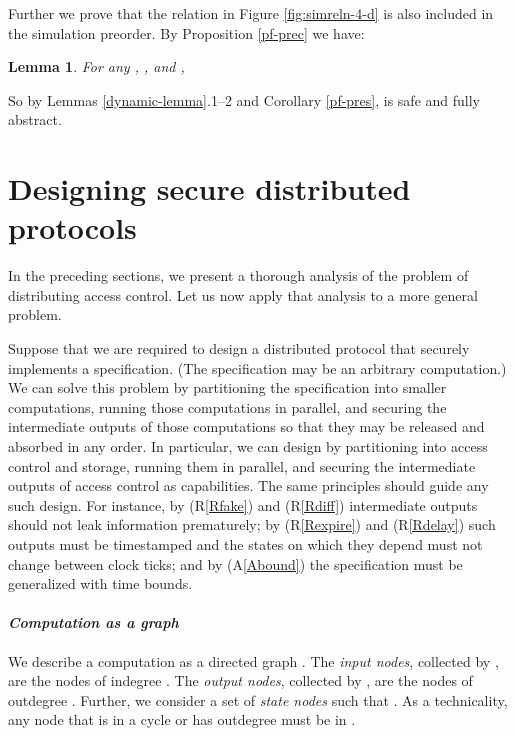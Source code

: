 \documentclass[10pt]{article}
\newtheorem{lemma}[theorem]{Lemma}
\begin{document}
Further we prove that the relation  in Figure \ref{fig:simreln-4-d} is also included in the simulation preorder. By Proposition \ref{pf-prec} we have: 
\begin{lemma}\label{dynamic-safetylemma} For any , , and , 
\vspace{0.2cm}
\par 
\par 
\end{lemma}
So by Lemmas \ref{dynamic-lemma}.1--2 and Corollary \ref{pf-pres},  is safe and fully abstract. 







\section{Designing secure distributed protocols}\label{apply}
\noindent
In the preceding sections, we present a thorough analysis of the problem of distributing access control. Let us now apply that analysis to a more general problem.


Suppose that we are required to design a distributed protocol that securely implements a specification. (The specification may be an arbitrary computation.) We can solve this problem by partitioning the specification into smaller computations, running those computations in parallel, and securing the intermediate outputs of those computations so that they may be released and absorbed in any order. 
In particular, we can design  by partitioning  into access control and storage, running them in parallel, and securing the intermediate outputs of access control as capabilities. The same principles should guide any such design. For instance,  by (R\ref{Rfake}) and (R\ref{Rdiff}) intermediate outputs should not leak information prematurely;  by (R\ref{Rexpire}) and (R\ref{Rdelay}) such outputs must be timestamped and the states on which they depend must not change between clock ticks; and  by (A\ref{Abound}) the specification must be generalized with time bounds.

\paragraph{\em Computation as a graph}
\noindent
We describe a computation as a directed graph . The \emph{input nodes}, collected by , are the nodes of indegree . The \emph{output nodes}, collected by , are the nodes of outdegree . Further, we consider a set of  \emph{state nodes}  such that . As a technicality, any node that is in a cycle or has outdegree  must be in . 
\end{document}
